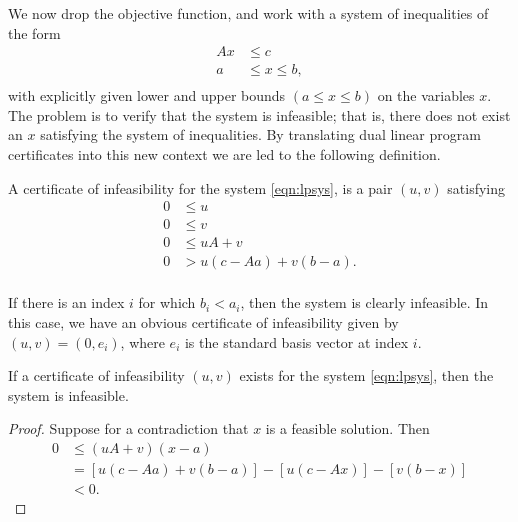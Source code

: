 We now drop the objective function, and work
with a system of inequalities  of the form
    \begin{equation}
    \label{eqn:lpsys}
    \begin{array}{lll}
    A x &\le c\\
    a &\le x \le b,\\
    \end{array}
    \end{equation}
with explicitly given lower and upper bounds $(a\le x\le b)$ on
the variables $x$.  The problem
is to verify that the system is infeasible; that is, there does
not exist an $x$ satisfying the system of inequalities.  By
translating dual linear program certificates into this new context
we are led to the following definition.

\begin{definition}
  A certificate of infeasibility for the system \ref{eqn:lpsys},
  is a pair $(u,v)$ satisfying
    $$
    \begin{array}{lll}
    0&\le u\\
    0&\le v\\
    0&\le u A + v\\
    0& > u(c-Aa) + v(b-a). \\
    \end{array}
    $$
\end{definition}

\begin{example}
If there is an index $i$ for which $b_i < a_i$, then the system is
clearly infeasible.  In this case, we have an obvious certificate
of infeasibility given by $(u,v)=(0,e_i)$, where $e_i$ is the
standard basis vector at index $i$.
\end{example}

\begin{lemma}
  If a certificate of infeasibility $(u,v)$ exists for the system
  \ref{eqn:lpsys}, then the system is infeasible.
\end{lemma}

\begin{proof}
    Suppose for a contradiction that $x$ is a feasible solution.
    Then
    $$
    \begin{array}{lll}
    0 &\le (u A + v)(x-a) \\
      &= [u (c- A a) + v (b- a)] - [u (c - A x)] - [v (b - x)]\\
      &< 0.
    \end{array}
    $$
\end{proof}


